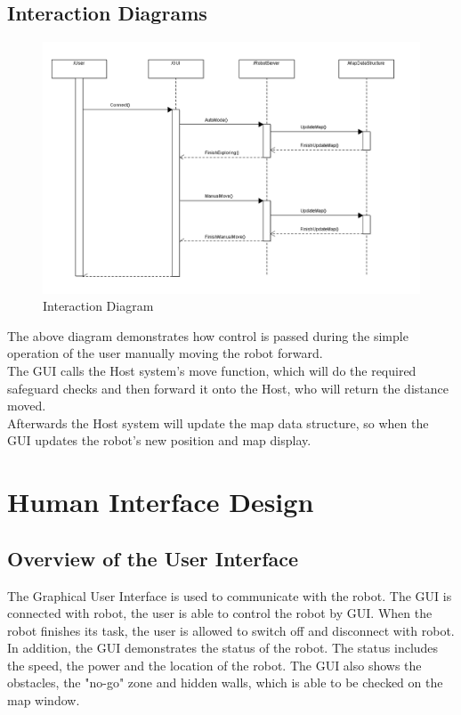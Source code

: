 \documentclass[11pt, a4paper]{report}
\begin{document}
\section{Interaction Diagrams}
\begin{figure}[h]
  \centering
    \includegraphics[width=16cm]{SEP_13_Sequence_Diagram.png}
  \caption{Interaction Diagram}
\end{figure}
The above diagram demonstrates how control is passed during the simple operation of the user manually moving the robot forward.
\\The GUI calls the Host system's move function, which will do the required safeguard checks and then forward it onto the Host, who will return the distance moved.
\\Afterwards the Host system will update the map data structure, so when the GUI updates the robot's new position and map display.

\pagebreak


\chapter{Human Interface Design}%
\label{cha:HID}

\section{Overview of the User Interface}
The Graphical User Interface is used to communicate with the robot. The GUI is connected with robot, the user is able to control the robot by GUI. When the robot finishes its task, the user is allowed to switch off and disconnect with robot. In addition, the GUI demonstrates the status of the robot. The status includes the speed, the power and the location of the robot. The GUI also shows the obstacles, the "no-go" zone and hidden walls, which is able to be checked on the map window.\\
\end{document}
